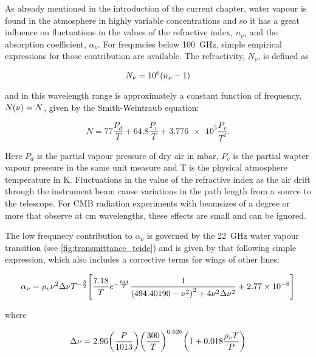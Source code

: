 As already mentioned in the introduction of the current chapter, water
vapour is found in the atmosphere in highly variable concentrations and so
it has a great influence on fluctuations in the values of the refractive
index, $n_\nu$, and the absorption coefficient, $\alpha_\nu$. For frequncies
below \SI{100}{\giga\hertz}, simple empirical expressions for those
contribution are available. The refractivity, $N_\nu$, is defined as

\begin{equation}
        N_\nu = \num{e6}\qty(n_\nu - 1)
\end{equation}

and in this wavelength range is approximately a constant function of
frequency, $N\qty(\nu) = N$, given by the Smith-Weintraub equation:

\begin{equation}
        N = 77\frac{P_d}{T} + 64.8\frac{P_v}{T} +
        \num{3.776e5}\frac{P_v}{T^2}.
\end{equation}

Here $P_d$ is the partial vapour pressure of dry air in
\si{\milli\bar}, $P_v$ is the partial wapter vapour pressure in the same
unit measure and T is the physical atmosphere temperature in \si{\kelvin}.
Fluctuations in the value of the refractive index as the air drift through
the instrument beam cause variations in the path length from a source to
the telescope. For CMB radiation experiments with beamsizes of a degree or
more that observe at \si{\centi\meter} wavelengths, these effects are small
and can be ignored.

The low frequnecy contribution to $\alpha_\nu$ is governed by the
\SI{22}{\giga\hertz} water vapour transition (see
\autoref{fig:transmittance_teide}) and is given by that following simple
expression, which also includes a corrective terms for wings of other
lines:

\begin{equation}
        \alpha_\nu = \rho_v\nu^2\Delta \nu T^{-\frac{3}{2}}
        \qty[\frac{7.18}{T} e^{-\frac{644}{T}}
        \frac{1}{\qty(494.40190 - \nu^2)^2 + 4\nu^2\Delta \nu^2}
        + \num{2.77e-8}]
\end{equation}

where

\begin{equation}
        \Delta \nu = 2.96\qty(\frac{P}{1013})\qty(\frac{300}{T})^{0.626}
        \qty(1 + 0.018\frac{\rho_v T}{P})
\end{equation}

